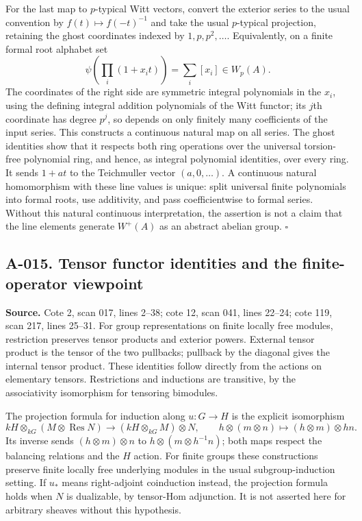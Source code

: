 \documentclass[11pt]{article}
\begin{document}
For the last map to $p$-typical Witt vectors, convert the exterior
series to the usual convention by $f(t)\mapsto f(-t)^{-1}$ and
take the usual $p$-typical projection, retaining the ghost coordinates
indexed by $1,p,p^2,\ldots$. Equivalently, on a finite formal root
alphabet set
\[
 \psi\left(\prod_i(1+x_it)\right)=\sum_i[x_i]\in W_p(A).
\]
The coordinates of the right side are symmetric integral
polynomials in the $x_i$, using the defining integral addition
polynomials of the Witt functor; its $j$th coordinate has degree
$p^j$, so depends on only finitely many coefficients of the input
series. This constructs a continuous natural map on all series.
The ghost identities show that it respects both ring operations
over the universal torsion-free polynomial ring, and hence, as
integral polynomial identities, over every ring. It sends
$1+at$ to the Teichmuller vector $(a,0,\ldots)$. A continuous
natural homomorphism with these line values is unique: split
universal finite polynomials into formal roots, use additivity,
and pass coefficientwise to formal series. Without this natural
continuous interpretation, the assertion is not a claim that the
line elements generate $W^+(A)$ as an abstract abelian group.
\hfill$\square$

\subsection*{A-015. Tensor functor identities and the finite-operator viewpoint}
\textbf{Source.} Cote 2, scan 017, lines 2--38; cote 12, scan 041,
lines 22--24; cote 119, scan 217, lines 25--31.
For group representations on finite locally free modules,
restriction preserves tensor products and exterior powers. External
tensor product is the tensor of the two pullbacks; pullback by the
diagonal gives the internal tensor product. These identities follow
directly from the actions on elementary tensors. Restrictions and
inductions are transitive, by the associativity isomorphism for
tensoring bimodules.

The projection formula for induction along $u:G\to H$ is the explicit
isomorphism
\[
 kH\otimes_{kG}(M\otimes\operatorname{Res}N)
 \longrightarrow(kH\otimes_{kG}M)\otimes N,
 \qquad h\otimes(m\otimes n)\longmapsto(h\otimes m)\otimes hn.
\]
Its inverse sends $(h\otimes m)\otimes n$ to
$h\otimes(m\otimes h^{-1}n)$; both maps respect the balancing
relations and the $H$ action. For finite groups these constructions
preserve finite locally free underlying modules in the usual
subgroup-induction setting. If $u_*$ means right-adjoint
coinduction instead, the projection formula holds when $N$ is
dualizable, by tensor-Hom adjunction. It is not asserted here for
arbitrary sheaves without this hypothesis.
\end{document}
